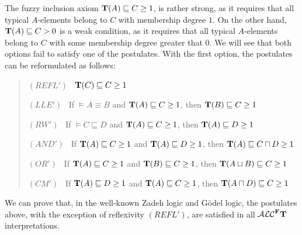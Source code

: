 \documentclass[runningheads]{llncs}
\newcommand{\tip}{{\bf T}}
\newcommand{\alcFt}{\mathcal{ALC}^{\Fe}\tip}
\newcommand {\Fe} {{\bf F}}
\begin{document}
The fuzzy inclusion axiom $\tip(A) \sqsubseteq C \geq 1$, is rather strong, as it requires that all typical $A$-elements belong to $C$ with membership degree $1$. On the other hand, $\tip(A) \sqsubseteq C > 0$ is a weak condition, as it requires that all typical $A$-elements belong to $C$ with some membership degree greater that $0$. We will see that both options fail to satisfy one of the postulates.
With the first option, the postulates can be reformulated as follows:


\begin{quote}
$(REFL')$ \ $\tip(C) \sqsubseteq C \geq 1$ 

$(LLE')$ \ If 
$\models A \equiv B$  and $\tip(A) \sqsubseteq C \geq 1$, then $\tip(B) \sqsubseteq C  \geq 1$ 

$(RW')$ \  If $\models C \sqsubseteq D$ and $\tip(A) \sqsubseteq C \geq 1$, then $\tip(A) \sqsubseteq D \geq 1$ 

$(AND')$ \ If $\tip(A) \sqsubseteq C \geq 1 $ and $\tip(A) \sqsubseteq D \geq 1$, then $\tip(A) \sqsubseteq C \sqcap D \geq 1$

$(OR')$ \ If $\tip(A) \sqsubseteq C \geq 1$ and $\tip(B) \sqsubseteq C \geq 1$, then $\tip(A \sqcup B) \sqsubseteq C \geq 1$

$(CM')$ \  If $\tip(A) \sqsubseteq D \geq 1$ and $\tip(A) \sqsubseteq C \geq 1$, then $\tip(A \sqcap D) \sqsubseteq C \geq 1$ 
\end{quote}
We can prove that, in the well-known Zadeh logic and G\"odel logic, the postulates above, with the exception of reflexivity $(REFL')$, are satisfied in all $\alcFt$ interpretations. 
\end{document}

